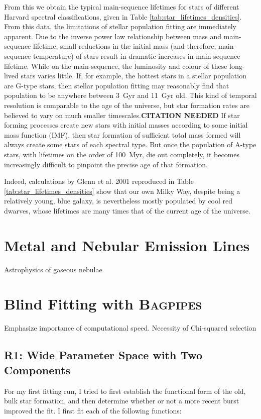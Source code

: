 \documentclass[a4paper,11pt]{article}
\begin{document}
\noindent From this we obtain the typical main-sequence lifetimes for stars of different Harvard spectral classifications, given in Table \ref{tab:star_lifetimes_densities}. From this data, the limitations of stellar population fitting are immediately apparent. Due to the inverse power law relationship between mass and main-sequence lifetime, small reductions in the initial mass (and therefore, main-sequence temperature) of stars result in dramatic increases in main-sequence lifetime. While on the main-sequence, the luminosity and colour of these long-lived stars varies little.\cite{Prialnik_2010} If, for example, the hottest stars in a stellar population are G-type stars, then stellar population fitting may reasonably find that population to be anywhere between \SI{3}{Gyr} and \SI{11}{Gyr} old. This kind of temporal resolution is comparable to the age of the universe, but star formation rates are believed to vary on much smaller timescales.\textbf{CITATION NEEDED} If star forming processes create new stars with initial masses according to some initial mass function (IMF), then star formation of sufficient total mass formed will always create some stars of each spectral type. But once the population of A-type stars, with lifetimes on the order of \SI{100}{Myr}, die out completely, it becomes increasingly difficult to pinpoint the precise age of that formation.

Indeed, calculations by Glenn et al. 2001 reproduced in Table \ref{tab:star_lifetimes_densities} show that our own Milky Way, despite being a relatively young, blue galaxy, is nevertheless mostly populated by cool red dwarves, whose lifetimes are many times that of the current age of the universe.

\section{Metal and Nebular Emission Lines}

Astrophysics of gaseous nebulae

\section{Blind Fitting with \textsc{Bagpipes}}\label{sec:blind_fitting}
Emphasize importance of computational speed. Necessity of Chi-squared selection
\subsection{R1: Wide Parameter Space with Two Components}\label{sec:r1}
For my first fitting run, I tried to first establish the functional form of the
old, bulk star formation, and then determine whether or not a more recent burst
improved the fit. I first fit each of the following functions:
\end{document}
